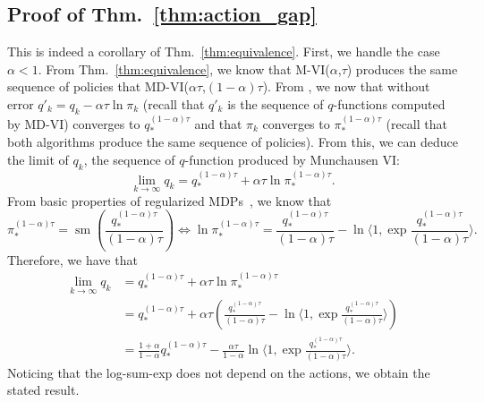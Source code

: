 \documentclass{article}
\DeclareMathOperator*{\softmax}{sm}
\begin{document}
\subsection{Proof of Thm.~\ref{thm:action_gap}}
\label{subappx:proof_action_gap}

This is indeed a corollary of Thm.~\ref{thm:equivalence}. First, we handle the case $\alpha<1$. From Thm.~\ref{thm:equivalence}, we know that M-VI($\alpha$,$\tau$) produces the same sequence of policies that MD-VI($\alpha\tau$,$(1-\alpha)\tau$). From \cite[Thm.~2]{vieillard2020leverage}, we now that without error $q'_k = q_k -\alpha\tau \ln \pi_k$ (recall that $q'_k$ is the sequence of $q$-functions computed by MD-VI) converges to $q_*^{(1-\alpha)\tau}$ and that $\pi_k$ converges to $\pi_*^{(1-\alpha)\tau}$ (recall that both algorithms produce the same sequence of policies). From this, we can deduce the limit of $q_k$, the sequence of $q$-function produced by Munchausen VI:
\begin{equation}
    \lim_{k\rightarrow\infty} q_k = q_*^{(1-\alpha)\tau} + \alpha \tau \ln \pi_*^{(1-\alpha)\tau}.
\end{equation}
From basic properties of regularized MDPs~\cite{geist2019theory}, we know that
\begin{equation}
    \pi_*^{(1-\alpha)\tau} = \softmax(\frac{q_*^{(1-\alpha)\tau}}{(1-\alpha)\tau})
    \Leftrightarrow
    \ln \pi_*^{(1-\alpha)\tau} = \frac{q_*^{(1-\alpha)\tau}}{(1-\alpha)\tau} - \ln\langle 1,\exp\frac{q_*^{(1-\alpha)\tau}}{(1-\alpha)\tau}\rangle.
\end{equation}
Therefore, we have that
\begin{align}
    \lim_{k\rightarrow\infty} q_k &= q_*^{(1-\alpha)\tau} + \alpha \tau \ln \pi_*^{(1-\alpha)\tau}
    \\
    &= q_*^{(1-\alpha)\tau} + \alpha\tau \left(\frac{q_*^{(1-\alpha)\tau}}{(1-\alpha)\tau} - \ln\langle 1,\exp\frac{q_*^{(1-\alpha)\tau}}{(1-\alpha)\tau}\rangle\right)
    \\
    &= \frac{1+\alpha}{1-\alpha} q_*^{(1-\alpha)\tau} - \frac{\alpha\tau}{1-\alpha} \ln\langle 1,\exp\frac{q_*^{(1-\alpha)\tau}}{(1-\alpha)\tau}\rangle.
\end{align}
Noticing that the log-sum-exp does not depend on the actions, we obtain the stated result.
\end{document}
